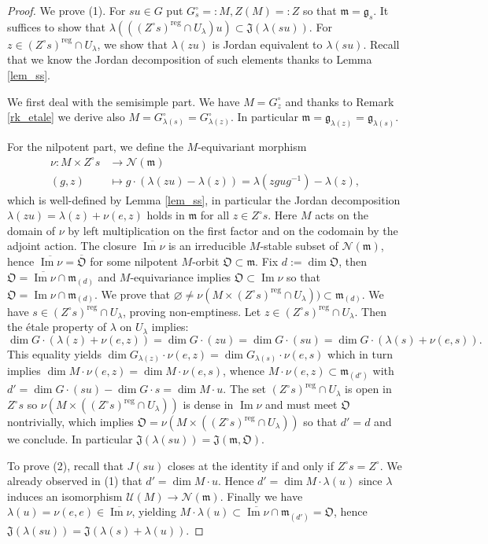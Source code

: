 \documentclass[10pt,a4paper]{amsart}
\newcommand{\J}{\mathfrak{J}}
\newcommand{\N}{\mathcal{N}}
\newcommand{\U}{\mathcal{U}}
\newcommand{\g}{\mathfrak{g}}
\newcommand{\image}{\operatorname{Im}}
\newcommand{\m}{\mathfrak{m}}
\newcommand{\orb}{\mathfrak{O}}
\newcommand{\reg}{{\operatorname{reg}}}
\begin{document}
\begin{proof}
We prove (1). For $su \in G$ put $G_s^\circ =: M, Z(M) =: Z$ so that $\m = \g_s$.
It suffices to show that $\lambda(((Z^\circ s)^\reg \cap U_\lambda) u) \subset \J(\lambda(su))$.
For $z \in (Z^\circ s)^\reg \cap U_\lambda$, we  show that $\lambda(zu)$ is Jordan equivalent to $\lambda(su)$.
Recall that we know the Jordan decomposition of such elements thanks to Lemma  \ref{lem_ss}.

We first deal with the semisimple part.
We have $M = G_z^\circ$ and thanks to  Remark \ref{rk_etale} we derive also $M = G_{\lambda(s)}^\circ = G_{\lambda(z)}^\circ$.
In particular $\m = \g_{\lambda(z)} = \g_{\lambda(s)}$.

For the nilpotent part, we define  the $M$-equivariant morphism 
\begin{align*}
\nu \colon M \times Z^\circ s &\to \N(\m) \\
(g, z) & \mapsto g \cdot (\lambda(zu) - \lambda(z)) = \lambda(z gug^{-1}) - \lambda(z),
\end{align*}
which is well-defined by Lemma \ref{lem_ss}, in particular the Jordan decomposition $\lambda(zu) = \lambda(z) + \nu(e,z)$ holds in $\m$ for all $z \in Z^\circ s$.
Here $M$ acts on the domain of $\nu$ by left multiplication on the first factor and on the codomain by the adjoint action.
The closure $\overline{\image \nu}$ is an irreducible $M$-stable subset of $\N(\m)$, hence $\overline{\image \nu} = \overline{\orb}$ for some nilpotent $M$-orbit $\orb \subset \m$.
Fix $d := \dim \orb$, then $\orb = \overline{\image \nu} \cap \m_{(d)}$ and $M$-equivariance implies $\orb \subset \image \nu$ so that $\orb = \image \nu \cap \m_{(d)}$.
We prove that $\varnothing \neq \nu (M \times ( Z^\circ s)^\reg \cap U_\lambda )) \subset \m_{(d)}$.
We  have $s \in (Z^\circ s)^\reg \cap U_\lambda$, proving non-emptiness.
Let $z \in (Z^\circ s)^\reg \cap U_\lambda$.
Then the \'etale property of $\lambda$ on $U_\lambda$ implies: $$\dim G \cdot (\lambda(z) + \nu(e,z)) = \dim G \cdot (zu) = \dim G \cdot (su) = \dim G \cdot (\lambda(s) + \nu(e,s)).$$
This equality yields 
$\dim G_{\lambda(z)} \cdot \nu(e,z) = \dim G_{\lambda(s)} \cdot \nu(e,s)$ which in turn implies
$\dim M \cdot \nu(e,z) = \dim M \cdot \nu (e,s)$, whence
$M \cdot \nu(e,z) \subset \m_{(d')}$
with $d' = \dim G \cdot (su) - \dim G \cdot s = \dim M \cdot u$.
The set $(Z^\circ s)^\reg \cap U_\lambda$ is open in $Z^\circ s$ so $\nu(M \times ((Z^\circ s)^\reg \cap U_\lambda))$ is dense in $\image \nu$ and must meet $\orb$ nontrivially, which implies $\orb = \nu(M \times ((Z^\circ s)^\reg \cap U_\lambda))$ so that $d' = d$ and we conclude.
In particular $\J(\lambda(su)) = \J(\m, \orb)$.

To prove (2), recall that $J(su)$ closes at the identity if and only if $Z^\circ s = Z^\circ$.
We already observed in (1) that $d' = \dim M \cdot u$.
Hence $d' = \dim M \cdot \lambda(u)$ since $\lambda$ induces an isomorphism $\U(M) \to \N(\m)$.
Finally we have $\lambda(u) = \nu(e,e) \in \overline{\image \nu}$, yielding
$M \cdot \lambda(u) \subset \overline{\image \nu} \cap \m_{(d')} = \orb$, hence $\J(\lambda(su)) = \J(\lambda(s) + \lambda(u))$.
\end{proof}
\end{document}
